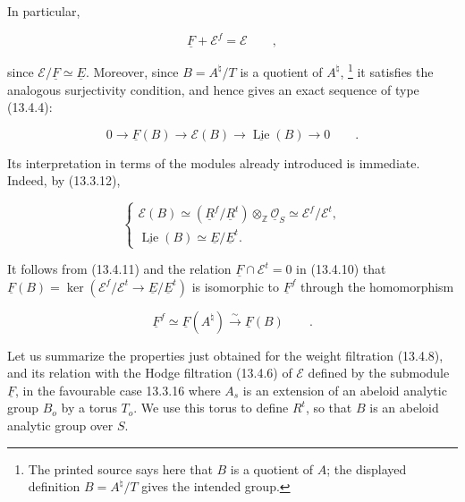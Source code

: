 \noindent
In particular,

\begin{equation}\tag{13.4.13}
 \underline F+\mathcal E^f=\mathcal E\qquad ,
\end{equation}

\noindent
since $\mathcal E/\underline F\simeq\underline E$.  Moreover, since
$B=A^\natural/T$ is a quotient of $A^\natural$,
\footnote{The printed source says here that $B$ is a quotient of $A$;
the displayed definition $B=A^\natural/T$ gives the intended group.}
it satisfies the analogous surjectivity condition, and hence gives an
exact sequence of type (13.4.4):

\begin{equation}\tag{13.4.14}
 0\longrightarrow\underline F(B)\longrightarrow\mathcal E(B)
 \longrightarrow\underline{\operatorname{Lie}}(B)
 \longrightarrow0\qquad .
\end{equation}

\noindent
Its interpretation in terms of the modules already introduced is
immediate.  Indeed, by (13.3.12),

\begin{equation}\tag{13.4.15}
 \left\{
 \begin{array}{l}
  \mathcal E(B)\simeq
  (\underline R^f/\underline R^t)\otimes_{\mathbb Z}
  \underline{\mathcal O}_S
  \simeq\mathcal E^f/\mathcal E^t,\\[2ex]
  \underline{\operatorname{Lie}}(B)
  \simeq\underline E/\underline E^t.
 \end{array}
 \right.
\end{equation}

\noindent
It follows from (13.4.11) and the relation
$\underline F\cap\mathcal E^t=0$ in (13.4.10) that
$\underline F(B)=\ker(\mathcal E^f/\mathcal E^t
\longrightarrow\underline E/\underline E^t)$ is isomorphic to
$\underline F^f$ through the homomorphism

\begin{equation}\tag{13.4.16}
 \underline F^f\simeq\underline F(A^\natural)
 \stackrel{\sim}{\longrightarrow}\underline F(B)\qquad .
\end{equation}

\noindent
Let us summarize the properties just obtained for the weight filtration
(13.4.8), and its relation with the Hodge filtration (13.4.6) of
$\mathcal E$ defined by the submodule $\underline F$, in the favourable
case 13.3.16 where $A_s$ is an extension of an abeloid analytic group
$B_o$ by a torus $T_o$.  We use this torus to define $R^t$, so that $B$
is an abeloid analytic group over $S$.

